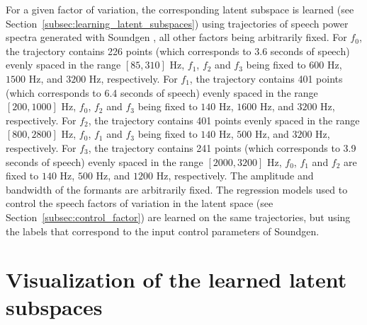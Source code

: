 \documentclass[review]{elsarticle}
\begin{document}
For a given factor of variation, the corresponding latent subspace is learned (see Section~\ref{subsec:learning_latent_subspaces}) using trajectories of speech power spectra generated with Soundgen \citep{Anikin2019}, all other factors being arbitrarily fixed. For $f_0$, the trajectory contains 226 points (which corresponds to 3.6 seconds of speech) evenly spaced in the range $[85, 310]$ Hz, $f_1$, $f_2$ and $f_3$ being fixed to $600$ Hz, $1500$ Hz, and $3200$ Hz, respectively. For $f_1$, the trajectory contains 401 points (which corresponds to 6.4 seconds of speech) evenly spaced in the range $[200, 1000]$ Hz, $f_0$, $f_2$ and $f_3$ being fixed to $140$ Hz, $1600$ Hz, and $3200$ Hz, respectively. For $f_2$, the trajectory contains 401 points evenly spaced in the range $[800, 2800]$ Hz, $f_0$, $f_1$ and $f_3$ being fixed to $140$ Hz, $500$ Hz, and $3200$ Hz, respectively. For $f_3$, the trajectory contains 241 points (which corresponds to 3.9 seconds of speech) evenly spaced in the range $[2000, 3200]$ Hz, $f_0$, $f_1$ and $f_2$ are fixed to $140$ Hz, $500$ Hz, and $1200$ Hz, respectively. The amplitude and bandwidth of the formants are arbitrarily fixed.
The regression models used to control the speech factors of variation in the latent space (see Section~\ref{subsec:control_factor}) are learned on the same trajectories, but using the labels that correspond to the input control parameters of Soundgen.

\section{Visualization of the learned latent subspaces}
\label{app:viz}
\end{document}
